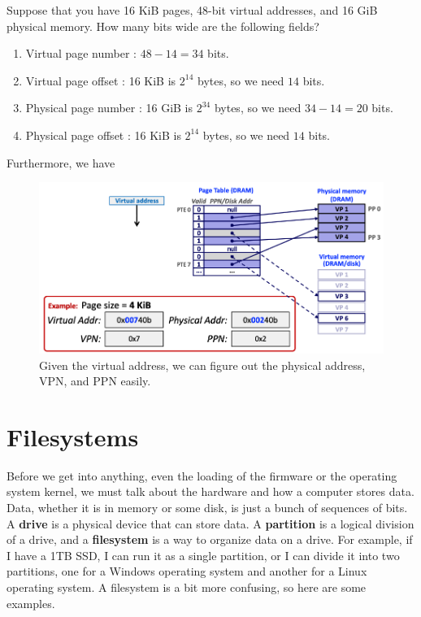 \documentclass{article}
\begin{document}
    \begin{example}
      Suppose that you have 16 KiB pages, 48-bit virtual addresses, and 16 GiB physical memory. How many bits wide are the following fields? 
      \begin{enumerate}
        \item Virtual page number : $48 - 14 = 34$ bits.
        \item Virtual page offset : 16 KiB is $2^{14}$ bytes, so we need $14$ bits.
        \item Physical page number : 16 GiB is $2^{34}$ bytes, so we need $34 - 14 = 20$ bits.
        \item Physical page offset : 16 KiB is $2^{14}$ bytes, so we need $14$ bits.
      \end{enumerate}
      Furthermore, we have 
      \begin{figure}[H]
        \centering 
        \includegraphics[scale=0.4]{img/page_example.png}
        \caption{Given the virtual address, we can figure out the physical address, VPN, and PPN easily. } 
        \label{fig:page_example}
      \end{figure}
    \end{example}

\section{Filesystems}

  Before we get into anything, even the loading of the firmware or the operating system kernel, we must talk about the hardware and how a computer stores data. Data, whether it is in memory or some disk, is just a bunch of sequences of bits. A \textbf{drive} is a physical device that can store data. A \textbf{partition} is a logical division of a drive, and a \textbf{filesystem} is a way to organize data on a drive. For example, if I have a 1TB SSD, I can run it as a single partition, or I can divide it into two partitions, one for a Windows operating system and another for a Linux operating system. A filesystem is a bit more confusing, so here are some examples. 
\end{document}
